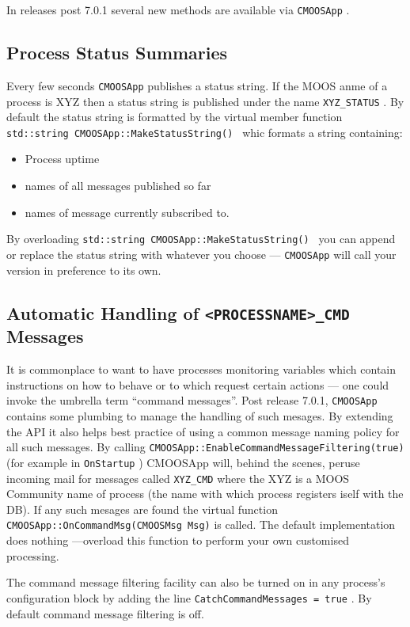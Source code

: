 \documentclass[a4paper,10pt]{article}
\newcommand{\Code}[1]{\texttt{#1} }
\newcommand{\code}[1]{\Code{#1} }
\begin{document}
In releases post 7.0.1 several new methods are available via \code{CMOOSApp}.

\subsection{Process Status Summaries}

Every few seconds \code{CMOOSApp} publishes a status string. If the MOOS anme of a process is XYZ then a status string is published under the name \code{XYZ\_STATUS}. By default the status string is formatted by the virtual member function \code{std::string CMOOSApp::MakeStatusString() } whic formats a string containing:
\begin{itemize}
\item Process uptime
\item names of all messages published so far
\item names of message currently subscribed to.
\end{itemize}

By overloading \code{std::string CMOOSApp::MakeStatusString() } you can append or replace the status string with whatever you choose --- \code{CMOOSApp} will call your version in preference to its own.

\subsection{Automatic Handling of \code{<PROCESSNAME>\_CMD} Messages}

It is commonplace to want to have processes monitoring variables which contain instructions on how to behave or to which request certain actions --- one could invoke the umbrella term ``command messages''. Post release 7.0.1,  \code{CMOOSApp} contains some plumbing to manage the handling of such mesages. By extending the API it also helps best practice of using a common message naming policy for all such messages.
By calling \code{CMOOSApp::EnableCommandMessageFiltering(true)} (for example in \code{OnStartup}) CMOOSApp will, behind the scenes, peruse incoming mail for messages called \code{XYZ\_CMD} where the XYZ is a MOOS Community name of process (the name with which process registers iself with the DB). If any such mesages are found the virtual function \code{CMOOSApp::OnCommandMsg(CMOOSMsg Msg)} is called. The default implementation does nothing ---overload this function to perform your own customised processing.

The command message filtering facility can also be turned on in any process's  configuration block by adding the line \code{CatchCommandMessages = true}. By default command message filtering is off.
\end{document}
